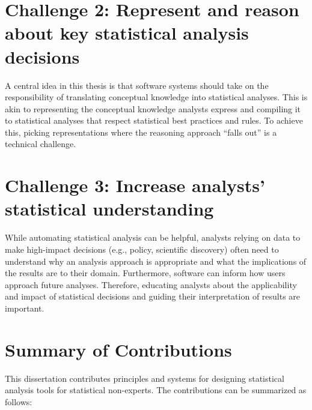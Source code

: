 

\def\thesisChallengeRep{\textbf{Thesis Challenge 2: Representation and reasoning}}
\section*{Challenge 2: Represent and reason about key statistical analysis decisions} %
A central idea in this thesis is that software systems should take on the
responsibility of translating conceptual knowledge into statistical analyses.
This is akin to representing the conceptual
knowledge analysts express and compiling it to statistical
analyses that respect statistical best practices and rules. 
To achieve this, picking representations where the reasoning approach ``falls out'' is a technical challenge.

\def\thesisChallengeUnderstanding{\textbf{Thesis Challenge 3: Statistical understanding}}
\section*{Challenge 3: Increase analysts' statistical understanding} %
While automating statistical analysis can be helpful, analysts relying on data
to make high-impact decisions (e.g., policy, scientific discovery) often need to
understand why an analysis approach is appropriate and what the implications of
the results are to their domain. Furthermore, software can inform how users
approach future analyses. Therefore, educating analysts about the applicability
and impact of statistical decisions and guiding their interpretation of results
are important.

\section{Summary of Contributions}
This dissertation contributes principles and systems for designing statistical analysis
tools for statistical non-experts. The contributions can be summarized as follows: 

